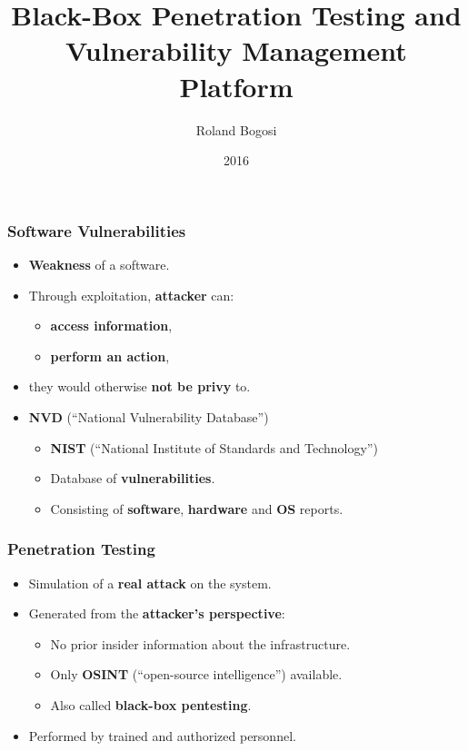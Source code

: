 \documentclass[aspectratio=169,xcolor={usenames,dvipsnames}]{beamer}
\title{Black-Box Penetration Testing and Vulnerability Management Platform}
\author{Roland Bogosi}
\date{2016}
\newcommand{\ispace}{\vspace{10pt}}
\begin{document}
	\frame{\titlepage}

\begin{frame}
	\frametitle{Software Vulnerabilities}
	
	\begin{itemize}
		\item \textbf{Weakness} of a software.
		\item Through exploitation, \textbf{attacker} can:
		\begin{itemize}
			\item \textbf{access information},
			\item \textbf{perform an action},
		\end{itemize}
		\item they would otherwise \textbf{not be privy} to.
	\end{itemize}
	
	\ispace
	
	\begin{itemize}
		\item \textbf{NVD} (``National Vulnerability Database'')
		\begin{itemize}
			\item \textbf{NIST} (``National Institute of Standards and Technology'')
			\item Database of \textbf{vulnerabilities}.
			\item Consisting of \textbf{software}, \textbf{hardware} and \textbf{OS} reports.
		\end{itemize}
	\end{itemize}
\end{frame}

\begin{frame}
	\frametitle{Penetration Testing}
	
	\begin{itemize}
		\item Simulation of a \textbf{real attack} on the system.
		\item Generated from the \textbf{attacker's perspective}:
		\begin{itemize}
			\item No prior insider information about the infrastructure.
			\item Only \textbf{OSINT} (``open-source intelligence'') available.
			\item Also called \textbf{black-box pentesting}.
		\end{itemize}
		\item Performed by trained and authorized personnel.
	\end{itemize}
\end{frame}
\end{document}
